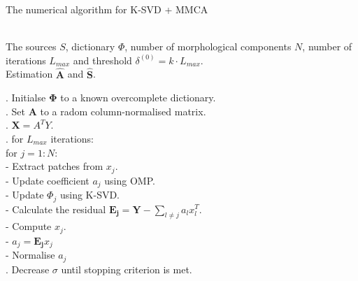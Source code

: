 \begin{algorithm}[!htbp] 
\caption{The numerical algorithm for K-SVD + MMCA} 
\label{alg:Framwork} 
\begin{algorithmic}
\REQUIRE ~~\\%
The sources $S$, dictionary $\Phi$, number of morphological components $N$, number of iterations $L_{max}$ and threshold $\delta^{(0)} = k \cdot L_{max}$.
\ENSURE ~~\\ %
Estimation $\hat{\mathbf{A}}$ and $\hat{\mathbf{S}}$.

. Initialse $\mathbf{\Phi}$ to a known overcomplete dictionary.\\
. Set $\mathbf{A}$ to a radom column-normalised matrix.\\
. $\mathbf{X} = A^T Y$.\\

. for $L_{max}$ iterations:\\
\quad \quad for $j = 1:N$:\\
\quad \quad \quad - Extract patches from $x_j$.\\
\quad \quad \quad - Update coefficient $a_j$ using OMP.\\
\quad \quad \quad - Update $\Phi_j$ using K-SVD.\\
\quad \quad \quad - Calculate the residual $\mathbf{E_j} = \mathbf{Y} - \sum_{l\neq j}a_lx_l^T$. \\
\quad \quad \quad - Compute $x_j$. \\
\quad \quad \quad - $a_j = \mathbf{E_j}x_j$ \\
\quad \quad \quad - Normalise $a_j$  \\
. Decrease $\sigma$ until stopping criterion is met. \\
\end{algorithmic}
\end{algorithm}

